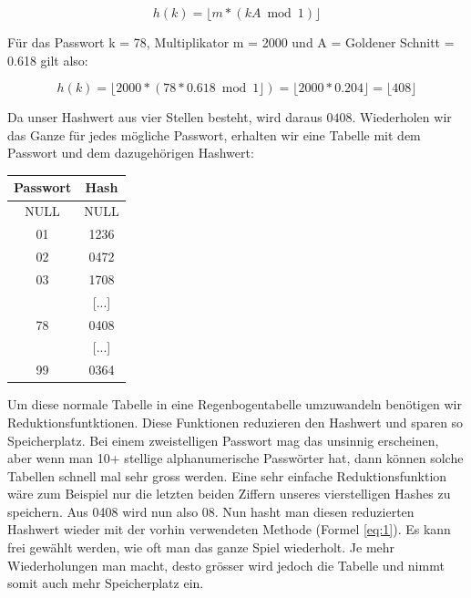 \documentclass[a4paper, 11pt, nofootinbib]{article}
\begin{document}
\begin{equation}
h(k) = \lfloor m * (kA \bmod 1) \rfloor \label{eq:1}
\end{equation}

\noindent Für das Passwort k = 78, Multiplikator m = 2000 und A = Goldener Schnitt = 0.618 gilt also:

\begin{equation}
	h(k) = \lfloor 2000 * (78 * 0.618 \bmod 1 \rfloor) = \lfloor 2000 * 0.204\rfloor = \lfloor 408 \rfloor
\end{equation}

Da unser Hashwert aus vier Stellen besteht, wird daraus $0408$. Wiederholen wir das Ganze für jedes mögliche Passwort, erhalten wir eine Tabelle mit dem Passwort und dem dazugehörigen Hashwert: \\
\begin{center}
\begin{tabular}{|c|c|}
	\hline 
	Passwort & Hash \\ 
	\hline  
	NULL & NULL  \\ 
	\hline 
	01 & 1236 \\ 
	\hline 
	02 & 0472 \\ 
	\hline 
	03 & 1708 \\ 
	\hline 
	[...] & [...] \\ 
	\hline 
	78 &  0408 \\ 
	\hline 
	[...]& [...] \\ 
	\hline 
	99 & 0364 \\ 
	\hline
\end{tabular} 
\end{center}

Um diese normale Tabelle in eine Regenbogentabelle umzuwandeln benötigen wir Reduktionsfuntktionen. Diese Funktionen reduzieren den Hashwert und sparen so Speicherplatz. Bei einem zweistelligen Passwort mag das unsinnig erscheinen, aber wenn man 10+ stellige alphanumerische Passwörter hat, dann können solche Tabellen schnell mal sehr gross werden. Eine sehr einfache Reduktionsfunktion wäre zum Beispiel nur die letzten beiden Ziffern unseres vierstelligen Hashes zu speichern. Aus 0408 wird nun also 08. Nun hasht man diesen reduzierten Hashwert wieder mit der vorhin verwendeten Methode (Formel \ref{eq:1}). Es kann frei gewählt werden, wie oft man das ganze Spiel wiederholt. Je mehr Wiederholungen man macht, desto grösser wird jedoch die Tabelle und nimmt somit auch mehr Speicherplatz ein.
\end{document}
